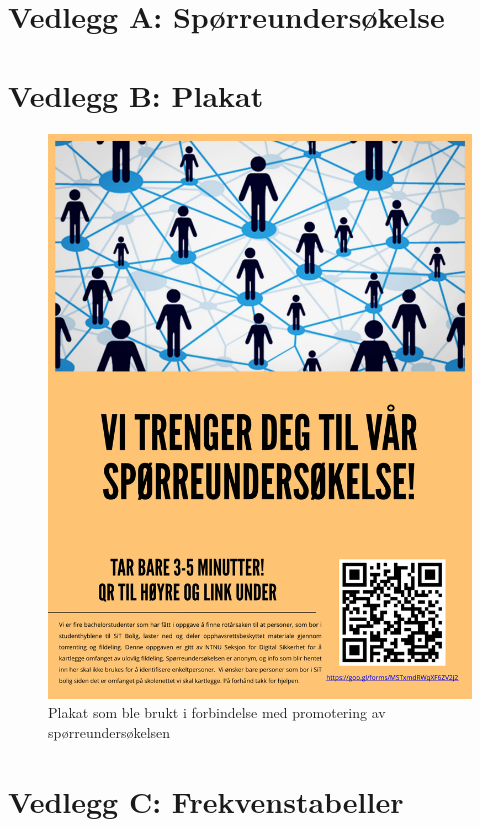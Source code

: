 \chapter*{Vedlegg A: Spørreundersøkelse}
\label{undersokelse}


\chapter*{Vedlegg B: Plakat}
\label{plakat}
\begin{figure}[H]
    \centering
    \includegraphics[scale=0.25]{case_1/bilder/plakat.pdf}
    \caption[Plakat]{Plakat som ble brukt i forbindelse med promotering av spørreundersøkelsen}
    \label{fig:plakat}
\end{figure}

\chapter*{Vedlegg C: Frekvenstabeller}
\label{frekvens}

